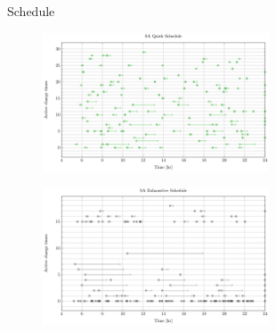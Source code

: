 \documentclass[aspectratio=169]{beamer}
\begin{document}
\begin{frame}[label={sec:orga316469}]{Schedule}
\begin{figure}[htpb]
\centering
    \includegraphics[width=0.6\textwidth]{img/sa-pap-paper-bad/schedule-sa-quick}
\end{figure}
\begin{figure}[htpb]
\centering
    \includegraphics[width=0.6\textwidth]{img/sa-pap-paper-bad/schedule-sa-heuristic}
\end{figure}
\end{frame}
\end{document}

